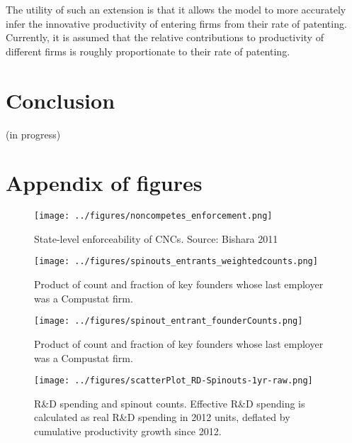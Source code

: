 \documentclass[12pt,english]{article}
\theoremstyle{remark}
\begin{document}
The utility of such an extension is that it allows the model to more accurately infer the innovative productivity of entering firms from their rate of patenting. Currently, it is assumed that the relative contributions to productivity of different firms is roughly proportionate to their rate of patenting.

\section{Conclusion}\label{conclusion}

(in progress)



\break
\appendix
\renewcommand\thefigure{\thesection.\arabic{figure}}  
\setcounter{figure}{0}


\section{Appendix of figures}\renewcommand{\thetable}{A\arabic{table}}

\begin{figure}	
	\center
	\caption{State-level enforceability of CNCs. Source: Bishara 2011}
	\texttt{[image: ../figures/noncompetes\_enforcement.png]}
	\label{noncompetes_enforcement}
\end{figure}

\begin{figure}[h]
	\centering
	\texttt{[image: ../figures/spinouts\_entrants\_weightedcounts.png]}
	\caption{Product of count and fraction of key founders whose last employer was a Compustat firm.}
	\label{spinout_entrants_counts_weighted}
\end{figure} 

\begin{figure}[p]
	\centering
	\texttt{[image: ../figures/spinout\_entrant\_founderCounts.png]}
	\caption{Product of count and fraction of key founders whose last employer was a Compustat firm.}
	\label{spinout_entrants_foundercounts}
\end{figure}

\begin{figure}[p]
	\centering
	\texttt{[image: ../figures/scatterPlot\_RD-Spinouts-1yr-raw.png]}
	\caption{R\&D spending and spinout counts. Effective R\&D spending is calculated as real R\&D spending in 2012 units, deflated by cumulative productivity growth since 2012.}
	\label{scatter_rd_spinoutcounts}
\end{figure}
\end{document}
